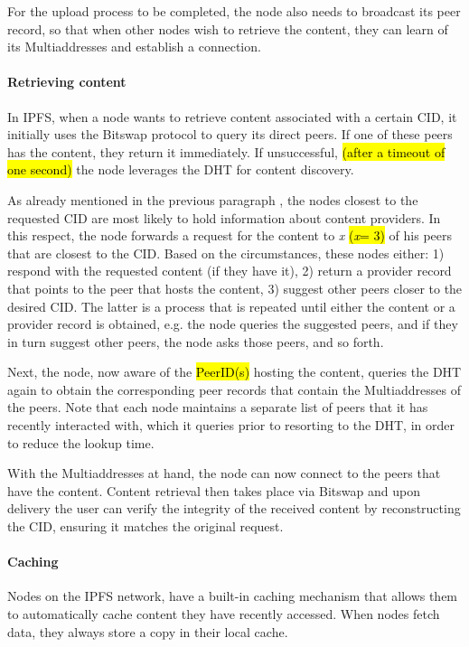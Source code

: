 For the upload process to be completed, the node also needs to broadcast its peer record, so that when other nodes wish to retrieve the content, they can learn of its Multiaddresses and establish a connection.

\paragraph{Retrieving content}\label{par:retrieving_ipfs}
In IPFS, when a node wants to retrieve content associated with a certain CID, it initially uses the Bitswap protocol to query its direct peers.  If one of these peers has the content, they return it immediately. If unsuccessful, \hl{(after a timeout of one second)} the node leverages the DHT for content discovery.

As already mentioned in the previous paragraph , the nodes closest to the requested CID are most likely to hold information about content providers. In this respect, the node forwards a request for the content to \textit{x} \hl{(\textit{x}= 3)} of his peers that are closest to the CID. Based on the circumstances, these nodes either: 1) respond with the requested content (if they have it), 2) return a provider record that points to the peer that hosts the content, 3) suggest other peers closer to the desired CID. The latter is a process that is repeated until either the content or a provider record is obtained, e.g. the node queries the suggested peers, and if they in turn suggest other peers, the node asks those peers, and so forth.

Next, the node, now aware of the \hl{PeerID(s)} hosting the content, queries the DHT again to obtain the corresponding peer records that contain the Multiaddresses of the peers. Note that each node maintains a separate list of peers that it has recently interacted with, which it queries prior to resorting to the DHT, in order to reduce the lookup time.

With the Multiaddresses at hand, the node can now connect to the peers that have the content. Content retrieval then takes place via Bitswap and upon delivery the user can verify the integrity of the received content by reconstructing the CID, ensuring it matches the original request.

\paragraph{Caching}\label{par:caching_ipfs}
Nodes on the IPFS network, have a built-in caching mechanism that allows them to automatically cache content they have recently accessed. When nodes fetch data, they always store a copy in their local cache.

